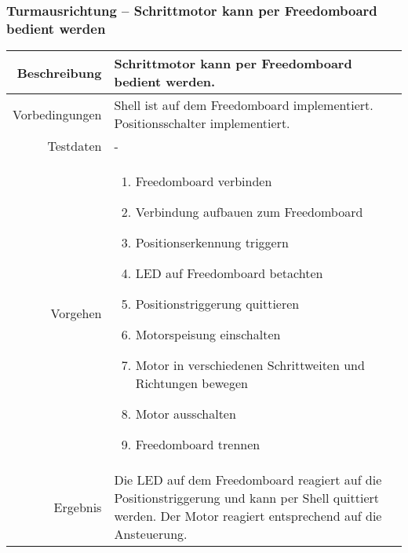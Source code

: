 \newpage
\subsubsection{Turmausrichtung -- Schrittmotor kann per Freedomboard bedient werden}
\begin{table}[h!]
	\renewcommand{\arraystretch}{1.5}
	\begin{tabular}{|r|p{14cm}|}
		\hline Beschreibung	&
			Schrittmotor kann per Freedomboard bedient werden. \\ 
		\hline Vorbedingungen	&
			Shell ist auf dem Freedomboard implementiert.
			Positionsschalter implementiert. \\ 
		\hline Testdaten	& - \\ 
		\hline Vorgehen		& 
		\begin{enumerate}
			\item Freedomboard verbinden
			\item Verbindung aufbauen zum Freedomboard
			\item Positionserkennung triggern
			\item LED auf Freedomboard betachten
			\item Positionstriggerung quittieren
			\item Motorspeisung einschalten
			\item Motor in verschiedenen Schrittweiten und Richtungen bewegen
			\item Motor ausschalten
			\item Freedomboard trennen
		\end{enumerate} \\ 
		\hline Ergebnis 	&
			Die LED auf dem Freedomboard reagiert auf die
			Positionstriggerung und kann per Shell quittiert werden.
			Der Motor reagiert entsprechend auf die Ansteuerung. \\ 
		\hline 
	\end{tabular}
\end{table}

\newpage
